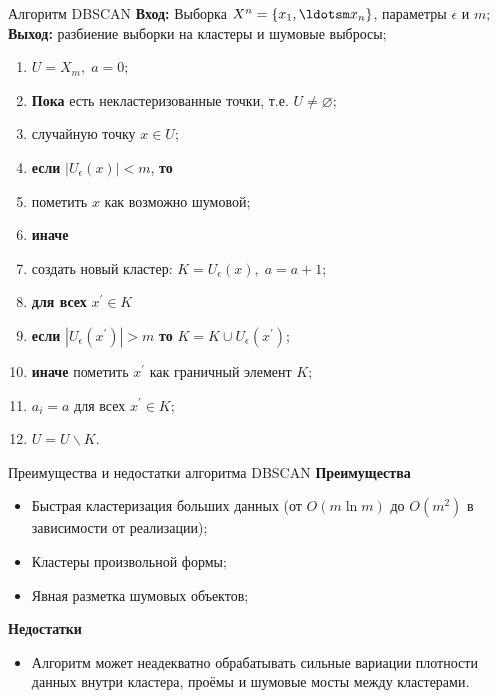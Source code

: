 \documentclass{beamer}
\begin{document}
\begin{frame}{Алгоритм DBSCAN}
\textbf{Вход:} Выборка $X^{n} = \{x_1, \ldotsm x_{n}\}$, параметры $\epsilon$ и  $m$;\\
\textbf{Выход:} разбиение выборки на кластеры и шумовые выбросы;
    \begin{enumerate}
       \item $U = X_m,\; a = 0$;
       \item \textbf{Пока} есть некластеризованные точки, т.е. $U \neq \varnothing$;
       \item {} случайную точку $x \in U$;
       \item \quad\textbf{если} $|U_{\epsilon}(x)| < m$, \textbf{то}
       \item \quad\quad пометить $x$ как возможно шумовой;
       \item \quad\textbf{иначе}
       \item \quad\quad создать новый кластер: $K = U_{\epsilon}(x),\; a = a + 1$;
       \item \quad\quad\textbf{для всех} $x^{'} \in K$
       \item \quad\quad\quad\textbf{если} $|U_{\epsilon}(x^{'})| > m$ \textbf{то} $K = K \cup U_{\epsilon}(x^{'})$;
       \item \quad\quad\quad\textbf{иначе} пометить $x^{'}$ как граничный элемент $K$;
       \item \quad\quad$a_i = a$ для всех $x^{'} \in K$;
       \item \quad\quad$U = U\backslash K$.
   \end{enumerate}
\end{frame}

\begin{frame}{Преимущества и недостатки алгоритма DBSCAN}
   \textbf{Преимущества}\\
   \begin{itemize}
       \item Быстрая кластеризация больших данных (от $O(m \ln m)$ до $O(m^2)$ в зависимости от реализации);
       \item Кластеры произвольной формы;
       \item Явная разметка шумовых объектов;
   \end{itemize}
   \vspace{4\ex}
   \textbf{Недостатки}\\
   \begin{itemize}
       \item Алгоритм может неадекватно обрабатывать сильные вариации плотности данных внутри кластера, проёмы и шумовые мосты между кластерами.
   \end{itemize}
\end{frame}
\end{document}
